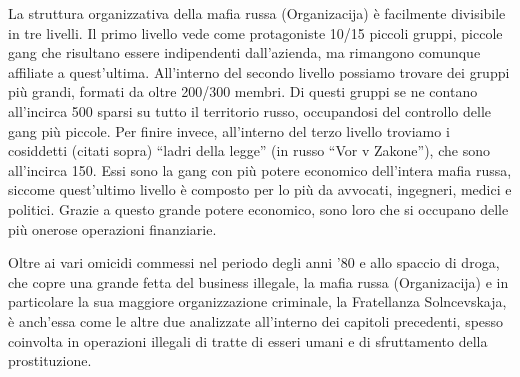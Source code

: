 \documentclass[a4paper, 11pt]{article}
\begin{document}

La struttura organizzativa della mafia russa (Organizacija) è facilmente divisibile in tre livelli. Il primo livello vede come protagoniste 10/15 piccoli gruppi, piccole gang che risultano essere indipendenti dall’azienda, ma rimangono comunque affiliate a quest’ultima. All’interno del secondo livello possiamo trovare dei gruppi più grandi, formati da oltre 200/300 membri. Di questi gruppi se ne contano all’incirca 500 sparsi su tutto il territorio russo, occupandosi del controllo delle gang più piccole. Per finire invece, all’interno del terzo livello troviamo i cosiddetti (citati sopra) “ladri della legge” (in russo “Vor v Zakone”), che sono all’incirca 150. Essi sono la gang con più potere economico dell’intera mafia russa, siccome quest’ultimo livello è composto per lo più da avvocati, ingegneri, medici e politici. Grazie a questo grande potere economico, sono loro che si occupano delle più onerose operazioni finanziarie.


Oltre ai vari omicidi commessi nel periodo degli anni ’80 e allo spaccio di droga, che copre una grande fetta del business illegale, la mafia russa (Organizacija) e in particolare la sua maggiore organizzazione criminale, la Fratellanza Solncevskaja, è anch’essa come le altre due analizzate all’interno dei capitoli precedenti, spesso coinvolta in operazioni illegali di tratte di esseri umani e di sfruttamento della prostituzione.
\end{document}
